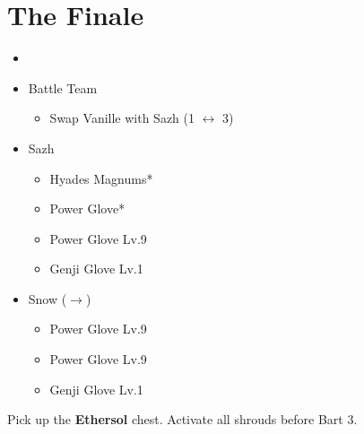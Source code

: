 \chapter{The Finale}

\begin{menu}
	\begin{itemize}
	\paradigm
		\begin{itemize}
			\item {}%
				{\paradigmline{\rav}{\rav}{\rav}}%
				{\paradigmline[4]{\com}{\com}{\com}}%
				{\paradigmline{\sab}{(\rav)}{\rav}}%
				{\paradigmline{(\med)}{\sen}{(\syn)}}%
				{\paradigmline{(\rav)}{(\rav)}{\syn}}%
				{\paradigmline{\com}{\com}{\med}}%
			\item Battle Team
				\begin{itemize}
					\item Swap Vanille with Sazh (1 $\leftrightarrow$ 3)
				\end{itemize}
		\end{itemize}
	\equip
		\begin{itemize}
			\item Sazh
				\begin{itemize}
					\item Hyades Magnums*
					\item Power Glove*
					\item Power Glove Lv.9
					\item Genji Glove Lv.1
				\end{itemize}
			\item Snow ($\rightarrow$)
				\begin{itemize}
					\item Power Glove Lv.9
					\item Power Glove Lv.9
					\item Genji Glove Lv.1
				\end{itemize}
		\end{itemize}
	\end{itemize}
\end{menu}

\renewcommand{\first}{[1] Tri-Disaster (\rav/\rav/\rav)}
\renewcommand{\second}{[2] Cerberus (\com/\com/\com)}
\renewcommand{\third}{[3] Smart Bomb (\rav/\rav/\sab)}
\renewcommand{\fourth}{[4] Protection (\syn/\sen/\med)}
\renewcommand{\fifth}{[5] Malevolence (\syn/\rav/\rav)}
\renewcommand{\sixth}{[6] Tireless Charge (\com/\com/\med)}

Pick up the \textbf{Ethersol} chest.
Activate all shrouds before Bart 3.


